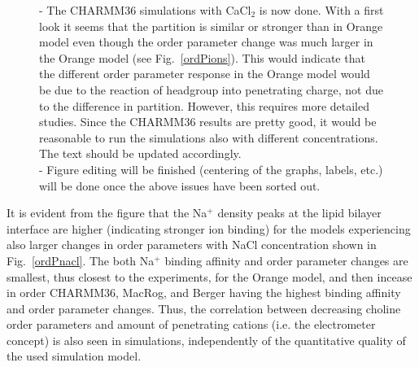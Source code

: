 \documentclass[pre,aps,floatfix,authordate1-4,twocolumn]{revtex4-1}
\begin{document}
\begin{figure}[]
{- The CHARMM36 simulations with CaCl$_2$ is now done. With a first look it seems that the partition is similar or stronger than in Orange model
even though the order parameter change was much larger in the Orange model (see Fig.~\ref{ordPions}).
This would indicate that the different order parameter response in the Orange model would be due to the reaction of headgroup into
penetrating charge, not due to the difference in partition. However, this requires more detailed studies.
Since the CHARMM36 results are pretty good, it would be reasonable to run the simulations also with different concentrations.
The text should be updated accordingly. \\
- Figure editing will be finished (centering of the graphs, labels, etc.) will be done once the above issues have been sorted out.
 }
\end{figure}
It is evident from the figure that the Na$^+$ density peaks at the lipid bilayer interface are higher (indicating stronger ion binding) for the models
experiencing also larger changes in order parameters with NaCl concentration shown in Fig.~\ref{ordPnacl}. 
The both Na$^+$ binding affinity and order parameter changes are smallest, thus closest to the experiments, for the Orange model, and then incease 
in order CHARMM36, MacRog, and Berger having the highest binding affinity and order parameter changes.
Thus, the correlation between decreasing choline order parameters
and amount of penetrating cations (i.e. the electrometer concept) is also seen in simulations, independently of the quantitative quality of the used simulation model.
\end{document}
